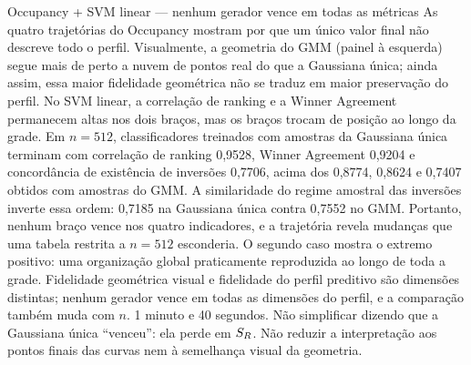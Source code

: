 {\begin{frame}{Occupancy + SVM linear — nenhum gerador vence em todas as métricas}
  \speakernotes
    {As quatro trajetórias do Occupancy mostram por que um único valor final não descreve todo o perfil. Visualmente, a geometria do GMM (painel à esquerda) segue mais de perto a nuvem de pontos real do que a Gaussiana única; ainda assim, essa maior fidelidade geométrica não se traduz em maior preservação do perfil. No SVM linear, a correlação de ranking e a Winner Agreement permanecem altas nos dois braços, mas os braços trocam de posição ao longo da grade. Em $n=512$, classificadores treinados com amostras da Gaussiana única terminam com correlação de ranking 0,9528, Winner Agreement 0,9204 e concordância de existência de inversões 0,7706, acima dos 0,8774, 0,8624 e 0,7407 obtidos com amostras do GMM. A similaridade do regime amostral das inversões inverte essa ordem: 0,7185 na Gaussiana única contra 0,7552 no GMM. Portanto, nenhum braço vence nos quatro indicadores, e a trajetória revela mudanças que uma tabela restrita a $n=512$ esconderia.}
    {O segundo caso mostra o extremo positivo: uma organização global praticamente reproduzida ao longo de toda a grade.}
    {Fidelidade geométrica visual e fidelidade do perfil preditivo são dimensões distintas; nenhum gerador vence em todas as dimensões do perfil, e a comparação também muda com $n$.}
    {1 minuto e 40 segundos.}
    {Não simplificar dizendo que a Gaussiana única ``venceu'': ela perde em $S_R$. Não reduzir a interpretação aos pontos finais das curvas nem à semelhança visual da geometria.}
\end{frame}}

